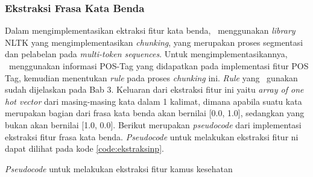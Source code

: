 \subsubsection{Ekstraksi Frasa Kata Benda}
Dalam mengimplementasikan ektraksi fitur kata benda, \saya~menggunakan \textit{library} NLTK yang mengimplementasikan \textit{chunking}, yang merupakan proses segmentasi dan pelabelan pada \textit{multi-token sequences}. Untuk mengimplementasikannya, \saya~menggunakan informasi POS-Tag yang didapatkan pada implementasi fitur POS Tag, kemudian menentukan \textit{rule} pada proses \textit{chunking} ini. \textit{Rule} yang \saya~gunakan sudah dijelaskan pada Bab 3. Keluaran dari ekstraksi fitur ini yaitu \textit{array of one hot vector} dari masing-masing kata dalam 1 kalimat, dimana apabila suatu kata merupakan bagian dari frasa kata benda akan bernilai [0.0, 1.0], sedangkan yang bukan akan bernilai [1.0, 0.0]. Berikut merupakan \textit{pseudocode} dari implementasi ekstraksi fitur frasa kata benda. \textit{Pseudocode} untuk melakukan ekstraksi fitur ni dapat dilihat pada kode \ref{code:ekstraksinp}.

\begin{kode}

	
	\SetAlgoLined
	\BlankLine
	
	\BlankLine	
	\caption{\textit{Pseudocode} untuk melakukan ekstraksi fitur kamus kesehatan}
	\label{code:ekstraksinp}	
\end{kode}

